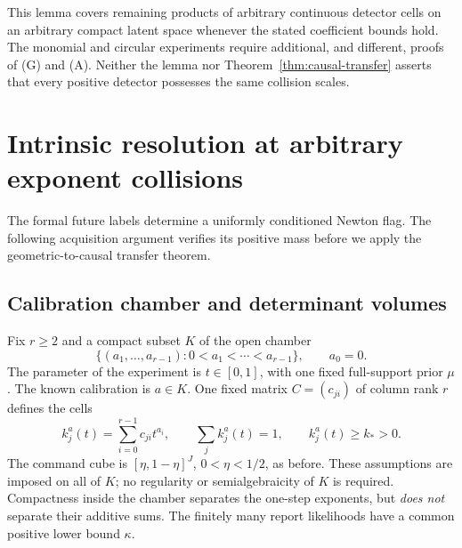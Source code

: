 \documentclass[11pt]{amsart}
\theoremstyle{definition}\newtheorem{definition}[theorem]{Definition}
\theoremstyle{remark}\newtheorem{remark}[theorem]{Remark}
\begin{document}
This lemma covers remaining products of arbitrary continuous detector
cells on an arbitrary compact latent space whenever the stated
coefficient bounds hold. The monomial and circular experiments require
additional, and different, proofs of (G) and (A). Neither the lemma nor
Theorem~\ref{thm:causal-transfer} asserts that every positive detector
possesses the same collision scales.

\section{Intrinsic resolution at arbitrary exponent collisions}\label{sec:collision-geometry}

The formal future labels determine a uniformly conditioned Newton flag.
The following acquisition argument verifies its positive mass before
we apply the geometric-to-causal transfer theorem.

\subsection{Calibration chamber and determinant volumes}
Fix $r\ge2$ and a compact subset $K$ of the open chamber
\[
 \{(a_1,\ldots,a_{r-1}):0<a_1<\cdots<a_{r-1}\},
 \qquad a_0=0.
\]
The parameter of the experiment is $t\in[0,1]$, with one fixed
full-support prior $\mu$. The known calibration is $a\in K$.
One fixed matrix $C=(c_{ji})$ of column rank $r$ defines the cells
\[
 k_j^a(t)=\sum_{i=0}^{r-1}c_{ji}t^{a_i},\qquad
 \sum_jk_j^a(t)=1,\qquad k_j^a(t)\ge k_*>0.
\]
The command cube is $[\eta,1-\eta]^J$, $0<\eta<1/2$, as before.
These assumptions are imposed on all of $K$; no regularity or
semialgebraicity of $K$ is required. Compactness inside the chamber
separates the one-step exponents, but \emph{does not} separate their
additive sums. The finitely many report likelihoods have a common
positive lower bound $\kappa$.
\end{document}
